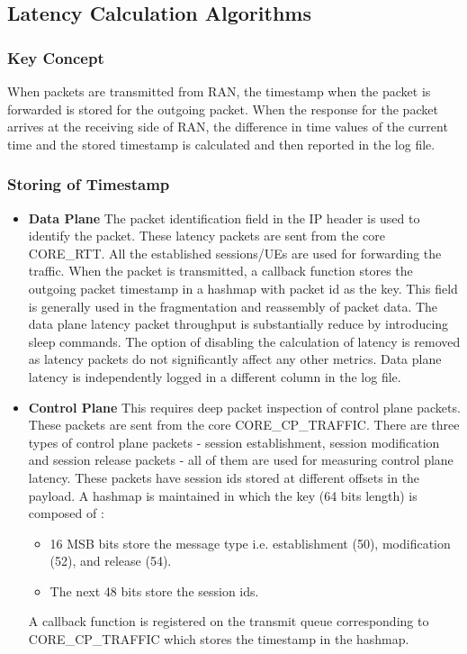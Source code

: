 \documentclass{article}
\begin{document}
\subsection{Latency Calculation Algorithms}
\subsubsection{Key Concept}
When packets are transmitted from RAN, the timestamp when the packet is forwarded is stored for the outgoing packet. When the response for the packet arrives at the receiving side of RAN, the difference in time values of the current time and the stored timestamp  is calculated and then reported in the log file.
\subsubsection{Storing of Timestamp}
\begin{itemize}
    \item \textbf{Data Plane} The packet identification field in the IP header is used to identify the packet. These latency packets
          are sent from the core CORE\_RTT. All the established sessions/UEs are used for forwarding the traffic. When the packet is
          transmitted, a callback  function stores the outgoing packet timestamp in a hashmap with packet id as the key. This field is
          generally used in the fragmentation and reassembly of packet data. The data plane latency packet throughput is substantially reduce by introducing sleep commands. The option of disabling the calculation of latency is removed as latency packets do   not significantly affect any other metrics. Data plane latency is independently logged in a different column in the log file.
    \item \textbf{Control Plane}
          This requires deep packet inspection of control plane packets. These packets are sent from the core CORE\_CP\_TRAFFIC.
          There are three types of control plane packets - session establishment, session modification and session release packets - all of
          them are used for measuring control plane latency. These packets have session ids stored at different offsets in the payload. A
          hashmap is maintained in which the key (64 bits length) is composed of :
          \begin{itemize}
              \item 16 MSB bits store the message type i.e. establishment (50), modification (52), and release (54).
              \item The next 48 bits store the session ids.
          \end{itemize}
          A callback function is registered on  the transmit queue corresponding to CORE\_CP\_TRAFFIC which stores the timestamp in the hashmap.
\end{itemize}
\end{document}
